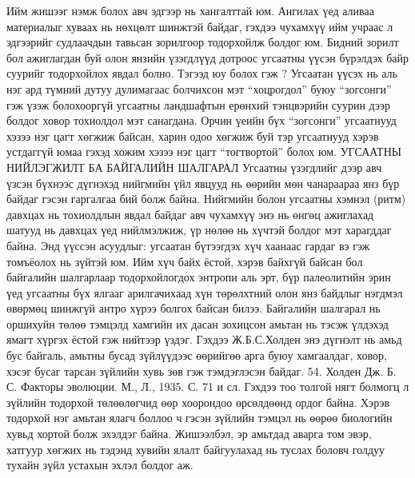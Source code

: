 Ийм жишээг нэмж болох авч эдгээр нь хангалттай юм. Ангилах үед аливаа материалыг хуваах нь нөхцөлт шинжтэй байдаг, гэхдээ чухамхүү ийм учраас л эдгээрийг судлаачдын тавьсан зорилгоор тодорхойлж болдог юм. Бидний зорилт бол ажиглагдан буй олон янзийн үзэгдлүүд дотроос угсаатны үүсэн бүрэлдэх байр суурийг тодорхойлох явдал болно. Тэгээд юу болох гэж ? Угсаатан үүсэх нь аль нэг ард түмний дутуу дулимагаас болчихсон мэт “хоцрогдол” буюу “зогсонги” гэж үзэж болохооргүй угсаатны ландшафтын ерөнхий тэнцвэрийн суурин дээр болдог ховор тохиолдол мэт санагдана. Орчин үеийн бүх “зогсонги” угсаатнууд хэзээ нэг цагт хөгжиж байсан, харин одоо хөгжиж буй тэр угсаатнууд хэрэв устдаггүй юмаа гэхэд хожим хэзээ нэг цагт “тогтвортой” болох юм.
УГСААТНЫ НИЙЛЭГЖИЛТ БА БАЙГАЛИЙН ШАЛГАРАЛ
Угсаатны үзэгдлийг дээр авч үзсэн бүхнээс дүгнэхэд нийгмийн үйл явцууд нь өөрийн мөн чанараараа янз бүр байдаг гэсэн гаргалгаа бий болж байна. Нийгмийн болон угсаатны хэмнэл (ритм) давхцах нь тохиолдлын явдал байдаг авч чухамхүү энэ нь өнгөц ажиглахад шатууд нь давхцах үед нийлмэлжиж, үр нөлөө нь хүчтэй болдог мэт харагддаг байна. Энд үүссэн асуудлыг: угсаатан бүтээгдэх хүч хаанаас гардаг вэ гэж томъёолох нь зүйтэй юм. Ийм хүч байх ёстой, хэрэв байхгүй байсан бол байгалийн шалгарлаар тодорхойлогдох энтропи аль эрт, бүр палеолитийн эрин үед угсаатны бүх ялгааг арилгачихаад хүн төрөлхтний олон янз байдлыг нэгдмэл өвөрмөц шинжгүй антро хүрээ болгох байсан билээ.
Байгалийн шалгарал нь оршихуйн төлөө тэмцэлд хамгийн их дасан зохицсон амьтан нь тэсэж үлдэхэд ямагт хүргэх ёстой гэж нийтээр үздэг. Гэхдээ Ж.Б.С.Холден энэ дүгнэлт нь амьд бус байгаль, амьтны бусад зүйлүүдээс өөрийгөө арга буюу хамгаалдаг, ховор, хэсэг бусаг тарсан зүйлийн хувь зөв гэж тэмдэглэсэн байдаг. 54. Холден Дж. Б. С. Факторы эволюции. М., Л., 1935. С. 71 и сл.
Гэхдээ тоо толгой нягт болмогц л зүйлийн тодорхой төлөөлөгчид өөр хоорондоо өрсөлдөөнд ордог байна. Хэрэв тодорхой нэг амьтан ялагч боллоо ч гэсэн зүйлийн тэмцэл нь өөрөө биологийн хувьд хортой болж эхэлдэг байна. Жишээлбэл, эр амьтдад аварга том эвэр, хатгуур хөгжих нь тэдэнд хувийн ялалт байгуулахад нь туслах боловч голдуу тухайн зүйл устахын эхлэл болдог аж.
